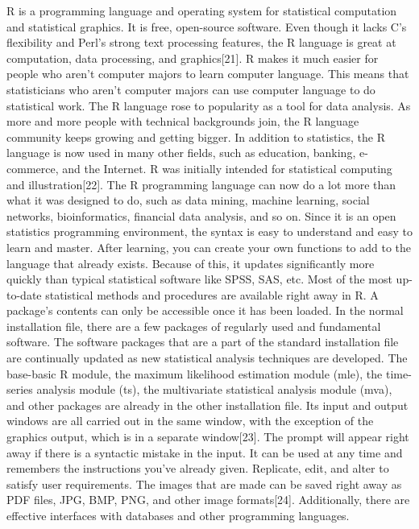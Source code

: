 \documentclass[journal]{IEEEtran}
\begin{document}
\par R is a programming language and operating system for statistical computation and statistical graphics. It is free, open-source software. Even though it lacks C's flexibility and Perl's strong text processing features, the R language is great at computation, data processing, and graphics[21]. R makes it much easier for people who aren't computer majors to learn computer language. This means that statisticians who aren't computer majors can use computer language to do statistical work. The R language rose to popularity as a tool for data analysis. As more and more people with technical backgrounds join, the R language community keeps growing and getting bigger. In addition to statistics, the R language is now used in many other fields, such as education, banking, e-commerce, and the Internet. R was initially intended for statistical computing and illustration[22]. The R programming language can now do a lot more than what it was designed to do, such as data mining, machine learning, social networks, bioinformatics, financial data analysis, and so on. Since it is an open statistics programming environment, the syntax is easy to understand and easy to learn and master. After learning, you can create your own functions to add to the language that already exists. Because of this, it updates significantly more quickly than typical statistical software like SPSS, SAS, etc. Most of the most up-to-date statistical methods and procedures are available right away in R. A package's contents can only be accessible once it has been loaded. In the normal installation file, there are a few packages of regularly used and fundamental software. The software packages that are a part of the standard installation file are continually updated as new statistical analysis techniques are developed. The base-basic R module, the maximum likelihood estimation module (mle), the time-series analysis module (ts), the multivariate statistical analysis module (mva), and other packages are already in the other installation file. Its input and output windows are all carried out in the same window, with the exception of the graphics output, which is in a separate window[23]. The prompt will appear right away if there is a syntactic mistake in the input. It can be used at any time and remembers the instructions you've already given. Replicate, edit, and alter to satisfy user requirements. The images that are made can be saved right away as PDF files, JPG, BMP, PNG, and other image formats[24]. Additionally, there are effective interfaces with databases and other programming languages.
\end{document}

